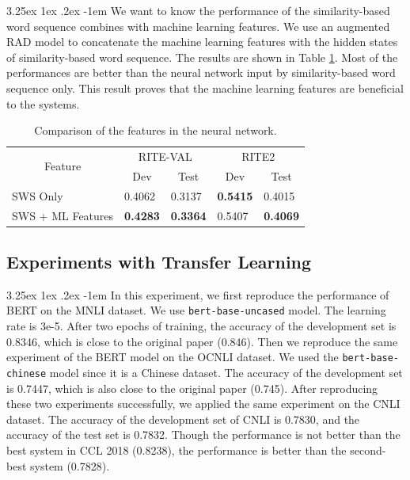 \documentclass[12pt]{article}
\makeatletter
\renewcommand\paragraph{\@startsection{paragraph}{5}{\z@}%
  {3.25ex \@plus1ex \@minus.2ex}%
  {-1em}%
  {\normalfont\normalsize\bfseries}}
\makeatother
\begin{document}
\begin{CJK*}{UTF8}{bkai}
\begin{spacing}{1.77}
\paragraph{}
We want to know the performance of the similarity-based word sequence combines with machine learning features. We use an augmented RAD model to concatenate the machine learning features with the hidden states of similarity-based word sequence. The results are shown in Table \ref{result:csa_nn}. Most of the performances are better than the neural network input by similarity-based word sequence only. This result proves that the machine learning features are beneficial to the systems.

\begin{table}[H]
  \centering
  \setlength{\extrarowheight}{-3pt}
  \caption{Comparison of the features in the neural network.}
  \label{result:csa_nn}
  \begin{tabular}{|l|l|l|l|l|}
  \hline
  \multicolumn{1}{|c|}{\multirow{2}{*}{Feature}} & \multicolumn{2}{c|}{RITE-VAL} & \multicolumn{2}{c|}{RITE2} \\ \cline{2-5}
  \multicolumn{1}{|c|}{} & \multicolumn{1}{c|}{Dev} & \multicolumn{1}{c|}{Test} & \multicolumn{1}{c|}{Dev} & \multicolumn{1}{c|}{Test} \\ \hline
  SWS Only & 0.4062 & 0.3137 & \textbf{0.5415} & 0.4015 \\ \hline
  SWS   + ML Features & \textbf{0.4283} & \textbf{0.3364} & 0.5407 & \textbf{0.4069} \\ \hline
  \end{tabular}
\end{table}

\subsection{Experiments with Transfer Learning}
\paragraph{}
In this experiment, we first reproduce the performance of BERT on the MNLI dataset. We use \texttt{bert-base-uncased} model. The learning rate is 3e-5. After two epochs of training, the accuracy of the development set is 0.8346, which is close to the original paper (0.846). Then we reproduce the same experiment of the BERT model on the OCNLI dataset. We used the \texttt{bert-base-chinese} model since it is a Chinese dataset. The accuracy of the development set is 0.7447, which is also close to the original paper (0.745). After reproducing these two experiments successfully, we applied the same experiment on the CNLI dataset. The accuracy of the development set of CNLI is 0.7830, and the accuracy of the test set is 0.7832. Though the performance is not better than the best system in CCL 2018 (0.8238), the performance is better than the second-best system (0.7828).


\end{spacing}
\end{CJK*}
\end{document}
